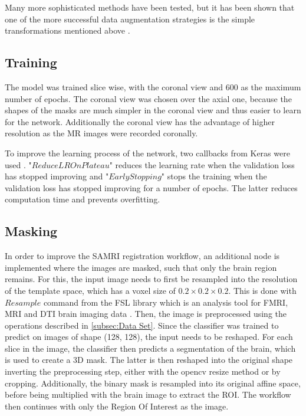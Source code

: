 Many more sophisticated methods have been tested, but it has been shown that one of the more successful data augmentation strategies is the simple transformations mentioned above \cite{perez_effectiveness_2017}.


\subsection{Training}
The model was trained slice wise, with the coronal view and 600 as the maximum number of epochs.
The coronal view was chosen over the axial one, because the shapes of the masks are much simpler in the coronal view and thus easier to learn for the network.
Additionally the coronal view has the advantage of higher resolution as the MR images were recorded coronally.

To improve the learning process of the network, two callbacks from Keras were used \cite{noauthor_callbacks_nodate}.
"\textcolor{mg}{\texttt{$ReduceLROnPlateau$}}" reduces the learning rate when the validation loss has stopped improving and "\textcolor{mg}{\texttt{$EarlyStopping$}}" stops the training when the validation loss has stopped improving for a number of epochs.
The latter reduces computation time and prevents overfitting.

\subsection{Masking}
In order to improve the SAMRI registration workflow, an additional node is implemented where the images are masked, such that only the brain region remains.
For this, the input image needs to first be resampled into the resolution of the template space, which has a voxel size of $0.2\times 0.2 \times 0.2$.
This is done with \textcolor{mg}{\texttt{$Resample$}} command from the FSL library which is an analysis tool for FMRI, MRI and DTI brain imaging data \cite{fsl}.
Then, the image is preprocessed using the operations described in \cref{subsec:Data Set}.
Since the classifier was trained to predict on images of shape (128, 128), the input needs to be reshaped.
For each slice in the image, the classifier then predicts a segmentation of the brain, which is used to create a 3D mask.
The latter is then reshaped into the original shape inverting the preprocessing step, either with the opencv resize method or by cropping.
Additionally, the binary mask is resampled into its original affine space, before being multiplied with the brain image to extract the ROI.
The workflow then continues with only the Region Of Interest as the image.
